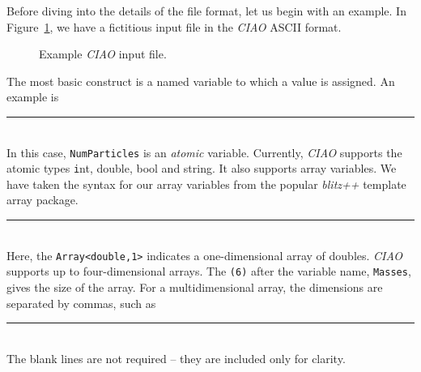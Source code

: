 \documentclass{book}
\begin{document}
Before diving into the details of the file format, let us begin with
an example.  In Figure~\ref{fig:InputEx}, we have a fictitious input
file in the {\em CIAO} ASCII format.
\begin{figure}
\caption{Example {\em CIAO} input file.}
\label{fig:InputEx}
\end{figure}

The most basic construct is a named variable to which a value is
assigned.  An example is \\
\rule{0.6cm}{0cm} \\
In this case, \texttt{NumParticles} is an {\em atomic} variable.
Currently, {\em CIAO} supports the atomic types {\texttt int, double,
  bool and string}.  It also supports array variables.  We have taken
the syntax for our array variables from the popular {\em blitz++}
template array package. \\
\rule{0.6cm}{0cm} \\
Here, the \texttt{Array<double,1>} indicates a one-dimensional array
of doubles.  {\em CIAO} supports up to four-dimensional arrays.  The
\texttt{(6)} after the variable name, \texttt{Masses}, gives the size
of the array.  For a multidimensional array, the dimensions are
separated by commas, such as\\
\rule{0.6cm}{0cm}\\
The blank lines are not required -- they are included only for
clarity.  
\end{document}

